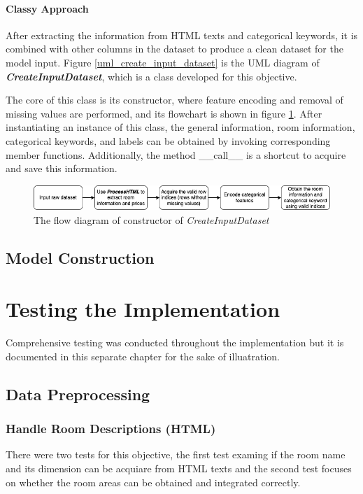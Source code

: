 \documentclass[12pt,twoside]{report}
\begin{document}
\subsubsection{Classy Approach}
After extracting the information from HTML texts and categorical keywords, it is combined with other columns in the dataset to produce a clean dataset for the model input.  Figure \ref{uml_create_input_dataset} is the UML diagram of \textit{\textbf{CreateInputDataset}}, which is a class developed for this objective.

The core of this class is its constructor, where feature encoding and removal of missing values are performed, and its flowchart is shown in figure \ref{create_input_dataset_constructor}. After instantiating an instance of this class, the general information, room information, categorical keywords, and labels can be obtained by invoking corresponding member functions. Additionally, the method \_\_call\_\_ is a shortcut to acquire and save this information. 
\begin{figure}[h]
	\centering
	\includegraphics[width=1\linewidth]{create_input_dataset_constructor}
	\caption{The flow diagram of constructor of \textit{CreateInputDataset}}
	\label{create_input_dataset_constructor}
\end{figure}

\section{Model Construction}

\chapter{Testing the Implementation}
Comprehensive testing was conducted throughout the implementation but it is documented in this separate chapter for the sake of illuatration. 

\section{Data Preprocessing}

\subsection{Handle Room Descriptions (HTML)}
There were two tests for this objective, the first test examing if the room name and its dimension can be acquiare from HTML texts and the second test focuses on whether the room areas can be obtained and integrated correctly. 
\end{document}
